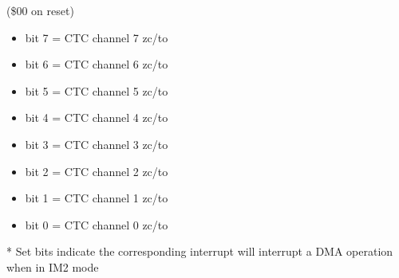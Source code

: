 (\$00 on reset)
\begin{itemize}
\item bit 7 = CTC channel 7 zc/to
\item bit 6 = CTC channel 6 zc/to
\item bit 5 = CTC channel 5 zc/to
\item bit 4 = CTC channel 4 zc/to
\item bit 3 = CTC channel 3 zc/to
\item bit 2 = CTC channel 2 zc/to
\item bit 1 = CTC channel 1 zc/to
\item bit 0 = CTC channel 0 zc/to
\end{itemize}
* Set bits indicate the corresponding interrupt will interrupt a DMA
  operation when in IM2 mode

